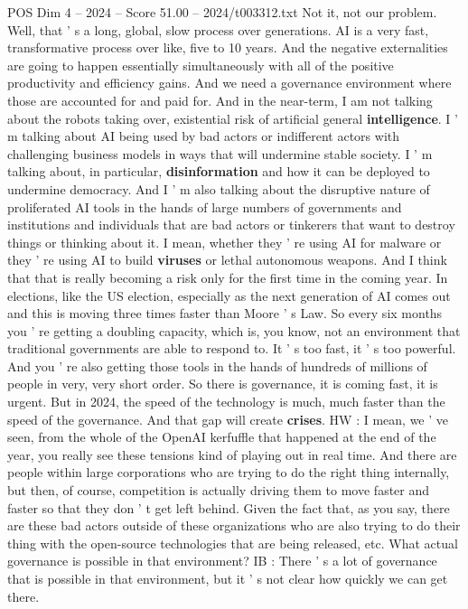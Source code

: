 \begin{textsample}{POS Dim 4 – 2024 – Score 51.00 – 2024/t003312.txt}
Not it, not our problem.
Well, that ' s a long, global, slow process over generations.
AI is a very fast, transformative process over like, five to 10 years.
And the negative externalities are going to happen essentially simultaneously with all of the positive productivity and efficiency gains.
And we need a governance environment where those are accounted for and paid for.
And in the near-term, I am not talking about the robots taking over, existential risk of artificial general \textbf{intelligence}.
I ' m talking about AI being used by bad actors or indifferent actors with challenging business models in ways that will undermine stable society.
I ' m talking about, in particular, \textbf{disinformation} and how it can be deployed to undermine democracy.
And I ' m also talking about the disruptive nature of proliferated AI tools in the hands of large numbers of governments and institutions and individuals that are bad actors or tinkerers that want to destroy things or thinking about it.
I mean, whether they ' re using AI for malware or they ' re using AI to build \textbf{viruses} or lethal autonomous weapons.
And I think that that is really becoming a risk only for the first time in the coming year.
In elections, like the US election, especially as the next generation of AI comes out and this is moving three times faster than Moore ' s Law.
So every six months you ' re getting a doubling capacity, which is, you know, not an environment that traditional governments are able to respond to.
It ' s too fast, it ' s too powerful.
And you ' re also getting those tools in the hands of hundreds of millions of people in very, very short order.
So there is governance, it is coming fast, it is urgent.
But in 2024, the speed of the technology is much, much faster than the speed of the governance.
And that gap will create \textbf{crises}.
HW : I mean, we ' ve seen, from the whole of the OpenAI kerfuffle that happened at the end of the year, you really see these tensions kind of playing out in real time.
And there are people within large corporations who are trying to do the right thing internally, but then, of course, competition is actually driving them to move faster and faster so that they don ' t get left behind.
Given the fact that, as you say, there are these bad actors outside of these organizations who are also trying to do their thing with the open-source technologies that are being released, etc.
What actual governance is possible in that environment?
IB : There ' s a lot of governance that is possible in that environment, but it ' s not clear how quickly we can get there.

\end{textsample}
